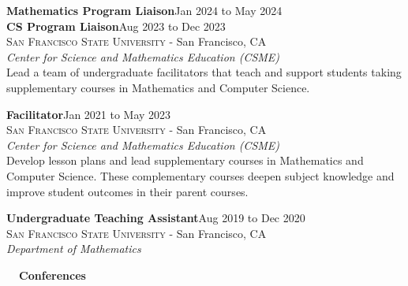 \documentclass[hidelinks, 10.5pt]{article}
\newcommand{\contentwidth}{0.9\linewidth}
\newcommand{\contentspacing}{2.5mm}
\newcommand{\sectionspacing}{8mm}
\newcommand{\sectiontocontentspacing}{4mm}
\begin{document}
{\vspace{\contentspacing}

\begin{minipage}[ct]{\contentwidth}
    \textbf{Mathematics Program Liaison}\hfill Jan 2024 to May 2024\\
    \textbf{CS Program Liaison}\hfill Aug 2023 to Dec 2023\\
    {\textsc{San Francisco State University} - San Francisco, CA}\\
    \textit{Center for Science and Mathematics Education (CSME)}\\
    Lead a team of undergraduate facilitators that teach and support students taking supplementary courses in Mathematics and Computer
    Science.
\end{minipage}

\vspace{\contentspacing}

\begin{minipage}[ct]{\contentwidth}
    \textbf{Facilitator}\hfill Jan 2021 to May 2023\\
    {\textsc{San Francisco State University} - San Francisco, CA}\\
    \textit{Center for Science and Mathematics Education (CSME)}\\
    Develop lesson plans and lead supplementary courses in Mathematics and Computer Science.  These complementary courses deepen subject
    knowledge and improve student outcomes in their parent courses.
\end{minipage}

\vspace{\contentspacing}

\begin{minipage}[ct]{\contentwidth}
    \textbf{Undergraduate Teaching Assistant}\hfill Aug 2019 to Dec 2020\\
    {\textsc{San Francisco State University} - San Francisco, CA}\\
    \textit{Department of Mathematics}
\end{minipage}

\vspace{\sectionspacing}


{\fontsize{14}{14}\selectfont \textbf{\ \ Conferences\ \ }}\hrulefill

\vspace{\sectiontocontentspacing}

}
\end{document}
